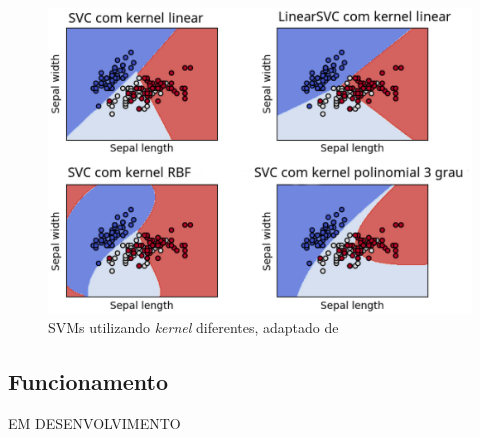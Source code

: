 \begin{figure}[!htb]
    \centering
     \includegraphics[width=1\textwidth]{figuras/svmkernel.eps}
     \caption{SVMs utilizando \textit{kernel} diferentes, adaptado de }
     \label{svmkernel}
 \end{figure}

 \subsection{Funcionamento}
EM DESENVOLVIMENTO
 